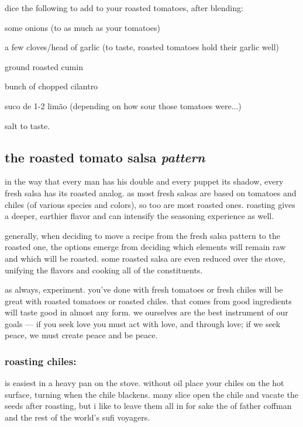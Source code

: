 dice the following to add to your roasted tomatoes, after blending:

\begin{ingredients}
  \item some onions (\onehalf to \onethird as much as your tomatoes)
  \item a few cloves/head of garlic (to taste, roasted tomatoes hold their garlic well)
  \item ground roasted cumin
  \item \onehalf bunch of chopped cilantro
  \item suco de 1-2 lim\~{a}o (depending on how sour those tomatoes were...)
\end{ingredients}

salt to taste.


\subsection{the roasted tomato salsa \textit{pattern}}

in the way that every man has his double and every puppet its shadow, every 
fresh salsa has its roasted analog. as most fresh salsas are based on tomatoes 
and chiles (of various species and colors), so too are most roasted ones. 
roasting gives a deeper, earthier flavor and can intensify the seasoning 
experience as well.

generally, when deciding to move a recipe from the fresh salsa pattern to the 
roasted one, the options emerge from deciding which elements will remain raw 
and which will be roasted. some roasted salsa are even reduced over the stove, 
unifying the flavors and cooking all of the constituents.

as always, experiment.  you've done with fresh tomatoes or fresh 
chiles will be great with roasted tomatoes or roasted chiles.  that 
comes from good ingredients will taste good in almost any form. we ourselves 
are the best instrument of our goals --- if you seek love you must act with 
love, and through love; if we seek peace, we must create peace and be peace.

\subsubsection{roasting chiles:}
is easiest in a heavy pan on the stove. without oil place your chiles on the 
hot surface, turning when the chile blackens. many slice open the chile and 
vacate the seeds after roasting, but i like to leave them all in for sake the 
of father coffman and the rest of the world's sufi voyagers.

